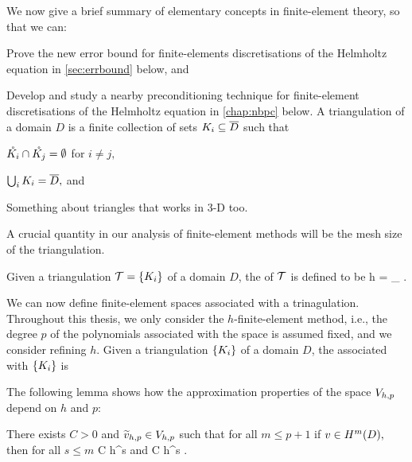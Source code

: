 We now give a brief summary of elementary concepts in finite-element theory, so that we can:
\ben
\item Prove the new error bound for finite-elements discretisations of the Helmholtz equation in \cref{sec:errbound} below, and
  \item Develop and study a nearby preconditioning technique for finite-element discretisations of the Helmholtz equation in \cref{chap:nbpc} below.
\een
    \bde[Triangulation]
    A triangulation of a  domain $D$ is a finite collection of sets $K_{i} \subseteq \overline{D}$ such that
    \ben
  \item $\mathring{K_{i}} \cap \mathring{K_{j}} = \emptyset$ for $ i \neq j,$
  \item $\bigcup_i K_{i} = \overline{D},$ and
    \item Something about triangles that works in 3-D too.
    \een
    \ede


    A crucial quantity in our analysis of finite-element methods will be the mesh size of the triangulation.

Given a triangulation $\cT = \set{\Ki}$ of a domain $D$, the  of $\mathcal T$ is defined to be
\beqs
h = \max_{\Ki} \diam{\Ki}.
\eeqs
\ede{}

    We can now define finite-element spaces associated with a trinagulation. Throughout this thesis, we only consider the $h$-finite-element method, i.e., the degree $p$ of the polynomials associated with the space is assumed fixed, and we consider refining $h.$
    Given a triangulation $\set{\Ki}$ of a domain $D$, the  associated with $\set{\Ki}$ is
    \beqs
\Vhp \de {}
    \eeqs{}
    \ede

    The following lemma shows how the approximation properties of the space $V_{h,p}$ depend on $h$ and $p$:

    There exists $C>0$ and $\widetilde{v}_{h,p} \in V_{h,p}$ such that for all $m \leq p+1$ if $v \in \HmD,$ then for all $s \leq m$
    \beqs
{} \leq C h^s 
    \eeqs
    and
    \beqs
{} \leq C h^s .
    \eeqs
    \ele

